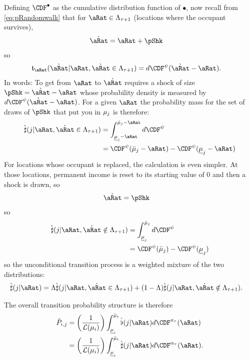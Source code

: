 \documentclass[\econtexRoot/BufferStockTheory.tex]{subfiles}
\begin{document}
Defining $\CDF^{\bullet}$ as the cumulative distribution function of $\bullet$, now recall from \eqref{eq:pRandomwalk} that for $\pnt \in \Liv_{\tAbs+1}$ (locations where the occupant survives),
\begin{align}
  \Nxt{\pnt} & = \pnt+\pShk
\end{align}
so
\begin{align}
  \DnsPntNxtFmPntNow_{\pnt}(\Nxt{\pnt}|\pnt, \Nxt{\pnt} \in \Liv_{\tAbs+1}) &=  d{\CDF^{\DnsShk}(\Nxt{\pnt}-\pnt)}.
\end{align}
In words: To get from $\pnt$ to $\Nxt{\pnt}$ requires a shock of size $\pShk = \Nxt{\pnt}-\pnt$ whose probability density is measured by $d\CDF^{\DnsShk}(\Nxt{\pnt}-\pnt)$.
For a given $\pnt$ the probability mass for the set of draws of $\pShk$ that put you in $\mu_{j}$ is therefore:
\newcommand{\erf}{\text{erf}}
\begin{align}
  \Nxt{\PrbBinNxtFmPntNowAprx}(\thatBin|\pnt,\Nxt{\pnt}\in\Liv_{\tAbs+1})  &= \int_{\Bot{\SetPartCnts}_{\thatBin}-\pnt}^{\Top{\SetPartCnts}_{\thatBin}-\pnt} d{\CDF^{\DnsShk}}
  \\ & = \CDF^{\DnsShk}(\Top{\SetPartCnts}_{\thatBin}-\pnt)-\CDF^{\DnsShk}(\Bot{\SetPartCnts}_{\thatBin}-\pnt) \notag
\end{align}
For locations whose occupant is replaced, the calculation is even simpler.  At those locations, permanent income is reset to its starting value of 0 and then a shock is drawn, so
\begin{align}
  \Nxt{\pnt} &= \pShk
\end{align}
so
\renewcommand{\Die}{(1-\Liv)}
\begin{align}
  \Nxt{\PrbBinNxtFmPntNowAprx}(\thatBin|\pnt,\Nxt{\pnt}\notin\Liv_{\tAbs+1})  &= \int_{\Bot{\SetPartCnts}_{\thatBin}}^{\Top{\SetPartCnts}_{\thatBin}} d{\CDF^{\DnsShk}}
  \\ & = \CDF^{\DnsShk}(\Top{\SetPartCnts}_{\thatBin})-\CDF^{\DnsShk}(\Bot{\SetPartCnts}_{\thatBin}) \notag
\end{align}
so the unconditional transition process is a weighted mixture of the two distributions:
\begin{align}
  \Nxt{\PrbBinNxtFmPntNowAprx}(\thatBin|\pnt)  &= \Liv\Nxt{\PrbBinNxtFmPntNowAprx}(\thatBin|\pnt,\Nxt{\pnt}\in\Liv_{\tAbs+1}) + (1-\Liv)    \Nxt{\PrbBinNxtFmPntNowAprx}(\thatBin|\pnt,\Nxt{\pnt}\notin\Liv_{\tAbs+1}).
\end{align}


The overall transition probability structure is therefore 
\begin{align}
  \TnsMrkv_{\thisBin,\thatBin}& = \left(\frac{1}{\Lebes(\SetPartCnts_{\thisBin})}\right)  \int_{\Bot{\SetPartCnts}_{\thisBin}}^{\Top{\SetPartCnts}_{\thisBin}} \Nxt{\PrbBinNxtFmPntNow}(\thatBin|\pnt) d\CDF^{\DnsPnt_{\tAbs}}(\pnt)
  \\ & = \left(\frac{1}{\Lebes(\SetPartCnts_{\thisBin})}\right)  \int_{\Bot{\SetPartCnts}_{\thisBin}}^{\Top{\SetPartCnts}_{\thisBin}} \Nxt{\PrbBinNxtFmPntNowAprx}(\thatBin|\pnt) d\CDF^{\DnsNxtAprx_{\tAbs}}(\pnt)                              .
\end{align}
\end{document}
